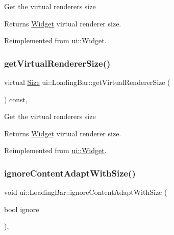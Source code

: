 Get the virtual renderer\textquotesingle{}s size \begin{DoxyReturn}{Returns}
\hyperlink{classui_1_1Widget}{Widget} virtual renderer size. 
\end{DoxyReturn}


Reimplemented from \hyperlink{classui_1_1Widget_a2ed0d41565593f78dc59c975d58a869e}{ui\+::\+Widget}.

\mbox{\label{classui_1_1LoadingBar_a7f0a12ed6e25f65890b71d34dd3f3c91}} 
\subsubsection{\texorpdfstring{get\+Virtual\+Renderer\+Size()}{getVirtualRendererSize()}\hspace{0.1cm}{\footnotesize\ttfamily [2/2]}}
{\footnotesize\ttfamily virtual \hyperlink{classSize}{Size} ui\+::\+Loading\+Bar\+::get\+Virtual\+Renderer\+Size (\begin{DoxyParamCaption}{ }\end{DoxyParamCaption}) const\hspace{0.3cm}{\ttfamily [override]}, {\ttfamily [virtual]}}

Get the virtual renderer\textquotesingle{}s size \begin{DoxyReturn}{Returns}
\hyperlink{classui_1_1Widget}{Widget} virtual renderer size. 
\end{DoxyReturn}


Reimplemented from \hyperlink{classui_1_1Widget_a2ed0d41565593f78dc59c975d58a869e}{ui\+::\+Widget}.

\mbox{\label{classui_1_1LoadingBar_a36fd58efdbc7b7e01adab806f2eab6f2}} 
\subsubsection{\texorpdfstring{ignore\+Content\+Adapt\+With\+Size()}{ignoreContentAdaptWithSize()}\hspace{0.1cm}{\footnotesize\ttfamily [1/2]}}
{\footnotesize\ttfamily void ui\+::\+Loading\+Bar\+::ignore\+Content\+Adapt\+With\+Size (\begin{DoxyParamCaption}\item[{bool}]{ignore }\end{DoxyParamCaption})\hspace{0.3cm}{\ttfamily [override]}, {\ttfamily [virtual]}}

